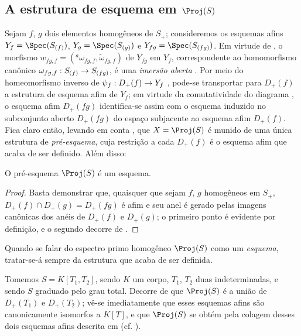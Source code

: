 \documentclass[oneside,10pt]{amsart}
\makeatletter
\newcommand{\ega@arrow}[2]{\mathchoice{#1}{#2}{#2}{#2}}
\renewcommand{\to}{\ega@arrow{\longrightarrow}{\rightarrow}}
\newcommand{\oldpage}[2][]{\marginnote{\normalfont\footnotesize\textbf{#1}~|~#2}\ignorespaces}
\let\EGAOriginalLabel\label
\renewcommand{\label}[1]{\phantomsection\EGAOriginalLabel{#1}}
\makeatother
\begin{document}
\subsection{A estrutura de esquema em $\Proj(S)$}
\label{subsection:II.2.4}

\begin{env}[2.4.1]
\label{II.2.4.1}
Sejam $f$, $g$ dois elementos homogêneos de $S_+$; consideremos os esquemas afins $Y_f=\Spec(S_{(f)})$, $Y_g=\Spec(S_{(g)})$ e $Y_{fg}=\Spec(S_{(fg)})$.
Em virtude de , o morfismo $w_{fg,f}=({}^a\!\omega_{fg,f},\widetilde{\omega}_{fg,f})$ de $Y_{fg}$ em $Y_f$, correspondente ao homomorfismo canônico $\omega_{fg,f}:S_{(f)}\to S_{(fg)}$, é uma \emph{imersão aberta} .
Por meio do homeomorfismo inverso de $\psi_f:D_+(f)\to Y_f$ , pode-se transportar para $D_+(f)$ a estrutura de esquema afim de $Y_f$; em virtude da comutatividade do diagrama , o esquema afim $D_+(fg)$ identifica-se assim com o esquema induzido no subconjunto aberto $D_+(fg)$ do espaço subjacente ao esquema afim $D_+(f)$.
Fica claro então, levando em conta , que $X=\Proj(S)$ é munido de uma única estrutura de \emph{pré-esquema}, cuja restrição a cada $D_+(f)$ é o esquema afim que acaba de ser definido.
Além disso:
\end{env}

\begin{proposition}[2.4.2]
\label{II.2.4.2}
O pré-esquema $\Proj(S)$ é um esquema.
\end{proposition}

\begin{proof}
Basta  demonstrar que, quaisquer que sejam $f$, $g$ homogêneos em $S_+$, $D_+(f)\cap D_+(g)=D_+(fg)$ é afim e seu anel é gerado pelas imagens canônicas dos anéis de $D_+(f)$ e $D_+(g)$; o primeiro ponto é evidente por definição, e o segundo decorre de .
\end{proof}
\oldpage[II]{29}
Quando se falar do espectro primo homogêneo $\Proj(S)$ como um \emph{esquema}, tratar-se-á sempre da estrutura que acaba de ser definida.

\begin{example}[2.4.3]
\label{II.2.4.3}
Tomemos $S=K[T_1,T_2]$, sendo $K$ um corpo, $T_1$, $T_2$ duas indeterminadas, e sendo $S$ graduado pelo grau total.
Decorre de  que $\Proj(S)$ é a união de $D_+(T_1)$ e $D_+(T_2)$; vê-se imediatamente que esses esquemas afins são canonicamente isomorfos a $K[T]$, e que $\Proj(S)$ se obtém pela colagem desses dois esquemas afins descrita em  (cf. ).
\end{example}
\end{document}
